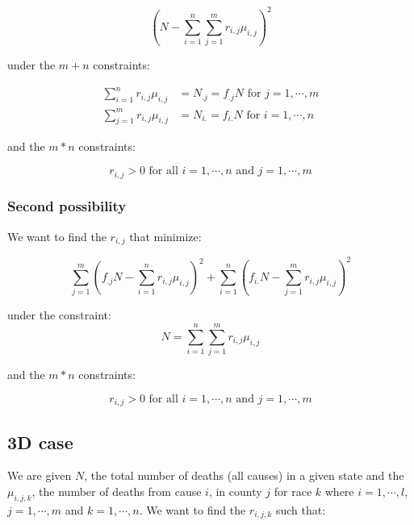 \begin{equation*}
\left( N - \sum_{i = 1}^n \sum_{j = 1}^m r_{i,j} \mu_{i,j} \right) ^2
\end{equation*}

under the $m + n$ constraints:

\begin{align*}
\sum_{i = 1}^n r_{i,j} \mu_{i,j} &= N_{.j} = f_{.j} N \text{ for } j = 1 , \cdots , m \\
\sum_{j = 1}^m r_{i,j} \mu_{i,j} &= N_{i.} = f_{i.} N \text{ for } i = 1 , \cdots , n
\end{align*}

and the $m * n$ constraints:

\begin{equation*}
r_{i,j} > 0 \text{ for all } i = 1 , \cdots , n \text{ and } j = 1 , \cdots , m
\end{equation*}

\subsubsection{Second possibility}

We want to find the $r_{i,j}$ that minimize:

\begin{equation*}
\sum_{j = 1}^m \left( f_{.j} N - \sum_{i = 1}^n r_{i,j} \mu_{i,j} \right) ^2 + \sum_{i = 1}^n \left( f_{i.} N - \sum_{j = 1}^m r_{i,j} \mu_{i,j} \right) ^2
\end{equation*}

under the constraint:
\begin{equation*}
N = \sum_{i = 1}^n \sum_{j = 1}^m r_{i,j} \mu_{i,j}
\end{equation*}

and the $m * n$ constraints:

\begin{equation*}
r_{i,j} > 0 \text{ for all } i = 1 , \cdots , n \text{ and } j = 1 , \cdots , m
\end{equation*}

\subsection{3D case}

We are given $N$, the total number of deaths (all causes) in a given state and the $\mu_{i,j,k}$, the number of deaths from cause $i$, in county $j$ for race $k$ where $i = 1 , \cdots , l$, $j = 1 , \cdots , m$ and $k = 1 , \cdots , n$. We want to find the $r_{i,j,k}$ such that:

